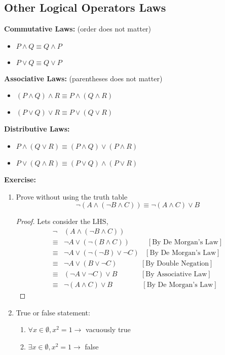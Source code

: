 \documentclass[11pt, a4paper]{memoir}
\theoremstyle{change}
\theoremstyle{plain}
\theoremstyle{nonumberplain}
\newtheorem{proof}{Proof}
\numberwithin{equation}{section}
\begin{document}
\subsection{Other Logical Operators Laws}
\textbf{Commutative Laws:} (order does not matter)
\begin{itemize}
    \item $P \wedge Q \equiv Q \wedge P$
    \item $P \vee Q \equiv Q \vee P$
\end{itemize}
\textbf{Associative Laws:} (parentheses does not matter)
\begin{itemize}
    \item $(P \wedge Q) \wedge R \equiv P \wedge (Q \wedge R)$
    \item $(P \vee Q) \vee R \equiv P \vee (Q \vee R)$
\end{itemize}
\textbf{Distributive Laws:}
\begin{itemize}
    \item $P \wedge (Q \vee R) \equiv (P \wedge Q) \vee (P \wedge R)$
    \item $P \vee (Q \wedge R) \equiv (P \vee Q) \wedge (P \vee R)$
\end{itemize}
\textbf{Exercise:} 
\begin{enumerate}
    \item Prove without using the truth table $$\neg (A \wedge (\neg B \wedge C)) \equiv \neg (A \wedge C) \vee B$$
    \begin{proof}
        Lets consider the LHS, 
        \begin{align*}
            \neg &(A \wedge (\neg B \wedge C))\\
            \equiv &\neg A \vee (\neg (B \wedge C)) \; \; \; \; \; \; \; \; \;[\text{By De Morgan's Law}] \\
            \equiv &\neg A \vee (\neg (\neg B) \vee \neg C) \; \; \; [\text{By De Morgan's Law}]\\
            \equiv &\neg A \vee (B \vee \neg C) \; \; \; \; \; \; \; \; \; \; \; \;[\text{By Double Negation}]\\
            \equiv &(\neg A \vee \neg C) \vee B \; \; \; \; \; \; \; \; \; \; \; \;[\text{By Associative Law}]\\
            \equiv &\neg (A \wedge C) \vee B \; \; \; \; \; \; \; \; \; \; \; \;\; \; \;[\text{By De Morgan's Law}]
        \end{align*}
    \end{proof}
    \item True or false statement: 
    \begin{enumerate}
        \item $\forall x \in \emptyset, x^2 = 1 \to$ vacuously true
        \item $\exists x \in \emptyset, x^2 = 1 \to$ false
    \end{enumerate}
\end{enumerate}
\end{document}
